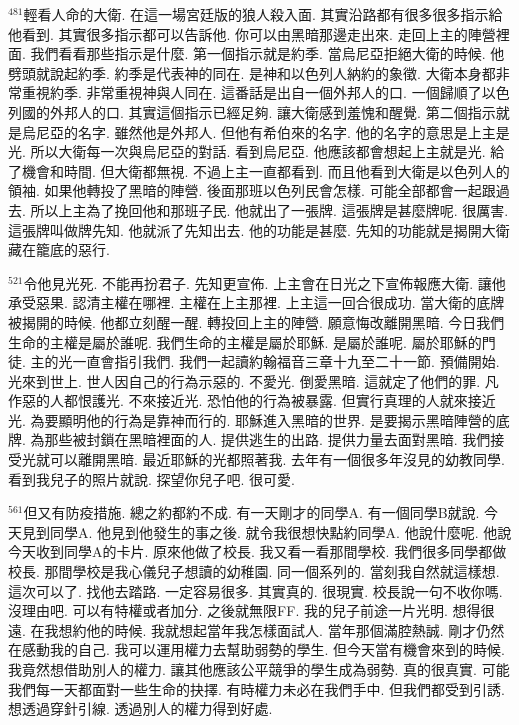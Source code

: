 \documentclass{book}
\begin{document}
$^{481}$輕看人命的大衛.
在這一場宮廷版的狼人殺入面.
其實沿路都有很多很多指示給他看到.
其實很多指示都可以告訴他.
你可以由黑暗那邊走出來.
走回上主的陣營裡面.
我們看看那些指示是什麼.
第一個指示就是約季.
當烏尼亞拒絕大衛的時候.
他劈頭就說起約季.
約季是代表神的同在.
是神和以色列人納約的象徵.
大衛本身都非常重視約季.
非常重視神與人同在.
這番話是出自一個外邦人的口.
一個歸順了以色列國的外邦人的口.
其實這個指示已經足夠.
讓大衛感到羞愧和醒覺.
第二個指示就是烏尼亞的名字.
雖然他是外邦人.
但他有希伯來的名字.
他的名字的意思是上主是光.
所以大衛每一次與烏尼亞的對話.
看到烏尼亞.
他應該都會想起上主就是光.
給了機會和時間.
但大衛都無視.
不過上主一直都看到.
而且他看到大衛是以色列人的領袖.
如果他轉投了黑暗的陣營.
後面那班以色列民會怎樣.
可能全部都會一起跟過去.
所以上主為了挽回他和那班子民.
他就出了一張牌.
這張牌是甚麼牌呢.
很厲害.
這張牌叫做牌先知.
他就派了先知出去.
他的功能是甚麼.
先知的功能就是揭開大衛藏在籠底的惡行.

$^{521}$令他見光死.
不能再扮君子.
先知更宣佈.
上主會在日光之下宣佈報應大衛.
讓他承受惡果.
認清主權在哪裡.
主權在上主那裡.
上主這一回合很成功.
當大衛的底牌被揭開的時候.
他都立刻醒一醒.
轉投回上主的陣營.
願意悔改離開黑暗.
今日我們生命的主權是屬於誰呢.
我們生命的主權是屬於耶穌.
是屬於誰呢.
屬於耶穌的門徒.
主的光一直會指引我們.
我們一起讀約翰福音三章十九至二十一節.
預備開始.
光來到世上.
世人因自己的行為示惡的.
不愛光.
倒愛黑暗.
這就定了他們的罪.
凡作惡的人都恨護光.
不來接近光.
恐怕他的行為被暴露.
但實行真理的人就來接近光.
為要顯明他的行為是靠神而行的.
耶穌進入黑暗的世界.
是要揭示黑暗陣營的底牌.
為那些被封鎖在黑暗裡面的人.
提供逃生的出路.
提供力量去面對黑暗.
我們接受光就可以離開黑暗.
最近耶穌的光都照著我.
去年有一個很多年沒見的幼教同學.
看到我兒子的照片就說.
探望你兒子吧.
很可愛.

$^{561}$但又有防疫措施.
總之約都約不成.
有一天剛才的同學A.
有一個同學B就說.
今天見到同學A.
他見到他發生的事之後.
就令我很想快點約同學A.
他說什麼呢.
他說今天收到同學A的卡片.
原來他做了校長.
我又看一看那間學校.
我們很多同學都做校長.
那間學校是我心儀兒子想讀的幼稚園.
同一個系列的.
當刻我自然就這樣想.
這次可以了.
找他去踏路.
一定容易很多.
其實真的.
很現實.
校長說一句不收你嗎.
沒理由吧.
可以有特權或者加分.
之後就無限FF.
我的兒子前途一片光明.
想得很遠.
在我想約他的時候.
我就想起當年我怎樣面試人.
當年那個滿腔熱誠.
剛才仍然在感動我的自己.
我可以運用權力去幫助弱勢的學生.
但今天當有機會來到的時候.
我竟然想借助別人的權力.
讓其他應該公平競爭的學生成為弱勢.
真的很真實.
可能我們每一天都面對一些生命的抉擇.
有時權力未必在我們手中.
但我們都受到引誘.
想透過穿針引線.
透過別人的權力得到好處.
\end{document}
